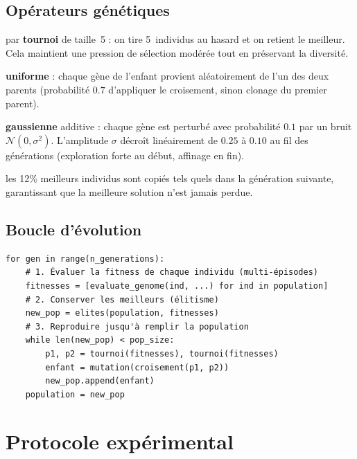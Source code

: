 \documentclass[11pt,a4paper]{article}
\begin{document}
\subsection{Opérateurs génétiques}
\begin{description}[leftmargin=1.5cm,style=nextline,nosep]
  \item[Sélection] par \textbf{tournoi} de taille~5 : on tire 5~individus au hasard
        et on retient le meilleur. Cela maintient une pression de sélection
        modérée tout en préservant la diversité.
  \item[Croisement] \textbf{uniforme} : chaque gène de l'enfant provient
        aléatoirement de l'un des deux parents (probabilité $0.7$ d'appliquer le
        croisement, sinon clonage du premier parent).
  \item[Mutation] \textbf{gaussienne} additive : chaque gène est perturbé avec
        probabilité $0.1$ par un bruit $\mathcal{N}(0,\sigma^2)$. L'amplitude
        $\sigma$ décroît linéairement de $0.25$ à $0.10$ au fil des générations
        (exploration forte au début, affinage en fin).
  \item[Élitisme] les 12\% meilleurs individus sont copiés tels quels dans la
        génération suivante, garantissant que la meilleure solution n'est jamais
        perdue.
\end{description}

\subsection{Boucle d'évolution}
\begin{lstlisting}
for gen in range(n_generations):
    # 1. Évaluer la fitness de chaque individu (multi-épisodes)
    fitnesses = [evaluate_genome(ind, ...) for ind in population]
    # 2. Conserver les meilleurs (élitisme)
    new_pop = elites(population, fitnesses)
    # 3. Reproduire jusqu'à remplir la population
    while len(new_pop) < pop_size:
        p1, p2 = tournoi(fitnesses), tournoi(fitnesses)
        enfant = mutation(croisement(p1, p2))
        new_pop.append(enfant)
    population = new_pop
\end{lstlisting}

\section{Protocole expérimental}
\end{document}
